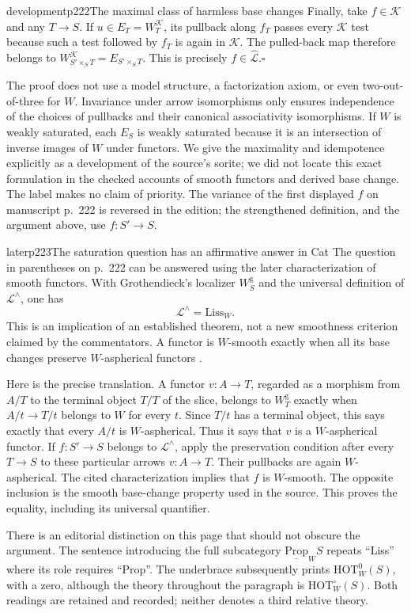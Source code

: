 \begin{dcomment}{development}{p222}{The maximal class of harmless base changes}
Finally, take $f\in\mathcal K$ and any $T\to S$. If $u\in E_T=W^{\mathcal K}_T$, its pullback along $f_T$ passes every $\mathcal K$ test because such a test followed by $f_T$ is again in $\mathcal K$. The pulled-back map therefore belongs to $W^{\mathcal K}_{S'\times_ST}=E_{S'\times_ST}$. This is precisely $f\in\widehat{\mathcal L}$.\hfill$\square$

The proof does not use a model structure, a factorization axiom, or even two-out-of-three for $W$. Invariance under arrow isomorphisms only ensures independence of the choices of pullbacks and their canonical associativity isomorphisms. If $W$ is weakly saturated, each $E_S$ is weakly saturated because it is an intersection of inverse images of $W$ under functors. We give the maximality and idempotence explicitly as a development of the source's sorite; we did not locate this exact formulation in the checked accounts of smooth functors and derived base change. The label makes no claim of priority. The variance of the first displayed $f$ on manuscript p.~222 is reversed in the edition; the strengthened definition, and the argument above, use $f:S'\to S$.
\end{dcomment}

\begin{dcomment}{later}{p223}{The saturation question has an affirmative answer in Cat}
The question in parentheses on p.~222 can be answered using the later characterization of smooth functors. With Grothendieck's localizer $W^{\mathrm g}_S$ and the universal definition of $\mathcal L^\wedge$, one has
\[
 \mathcal L^\wedge=\mathrm{Liss}_W.
\]
This is an implication of an established theorem, not a new smoothness criterion claimed by the commentators. A functor is $W$-smooth exactly when all its base changes preserve $W$-aspherical functors \citep[Theorem 1.2(c)]{Maltsiniotis2005Asphericite}.

Here is the precise translation. A functor $v:A\to T$, regarded as a morphism from $A/T$ to the terminal object $T/T$ of the slice, belongs to $W^{\mathrm g}_T$ exactly when $A/t\to T/t$ belongs to $W$ for every $t$. Since $T/t$ has a terminal object, this says exactly that every $A/t$ is $W$-aspherical. Thus it says that $v$ is a $W$-aspherical functor. If $f:S'\to S$ belongs to $\mathcal L^\wedge$, apply the preservation condition after every $T\to S$ to these particular arrows $v:A\to T$. Their pullbacks are again $W$-aspherical. The cited characterization implies that $f$ is $W$-smooth. The opposite inclusion is the smooth base-change property used in the source. This proves the equality, including its universal quantifier.

There is an editorial distinction on this page that should not obscure the argument. The sentence introducing the full subcategory $\underline{\mathrm{Prop}}_W S$ repeats ``Liss'' where its role requires ``Prop''. The underbrace subsequently prints $\mathrm{HOT}^{0}_W(S)$, with a zero, although the theory throughout the paragraph is $\mathrm{HOT}^{\circ}_W(S)$. Both readings are retained and recorded; neither denotes a third relative theory.
\end{dcomment}

